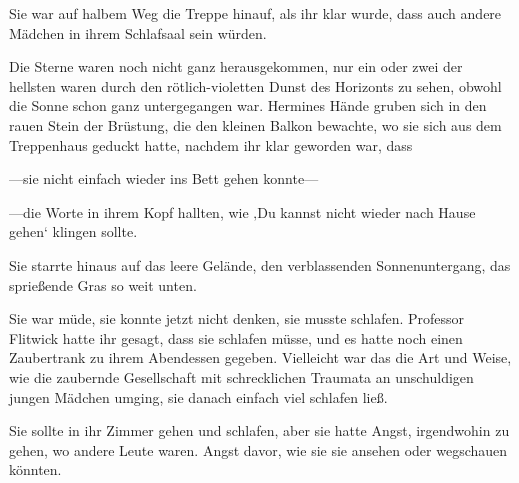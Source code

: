 Sie war auf halbem Weg die Treppe hinauf, als ihr klar wurde, dass auch andere Mädchen in ihrem Schlafsaal sein würden.

\later

Die Sterne waren noch nicht ganz herausgekommen, nur ein oder zwei der hellsten waren durch den rötlich-violetten Dunst des Horizonts zu sehen, obwohl die Sonne schon ganz untergegangen war.
%
Hermines Hände gruben sich in den rauen Stein der Brüstung, die den kleinen Balkon bewachte, wo sie sich aus dem Treppenhaus geduckt hatte, nachdem ihr klar geworden war, dass

—sie nicht einfach wieder ins Bett gehen konnte—

—die Worte in ihrem Kopf hallten, wie ‚Du kannst nicht wieder nach Hause gehen‘ klingen sollte.

Sie starrte hinaus auf das leere Gelände, den verblassenden Sonnenuntergang, das sprießende Gras so weit unten.

Sie war müde, sie konnte jetzt nicht denken, sie musste schlafen. Professor Flitwick hatte ihr gesagt, dass sie schlafen müsse, und es hatte noch einen Zaubertrank zu ihrem Abendessen gegeben.
Vielleicht war das die Art und Weise, wie die zaubernde Gesellschaft mit schrecklichen Traumata an unschuldigen jungen Mädchen umging, sie danach einfach viel schlafen ließ.

Sie sollte in ihr Zimmer gehen und schlafen, aber sie hatte Angst, irgendwohin zu gehen, wo andere Leute waren. Angst davor, wie sie sie ansehen oder wegschauen könnten.

